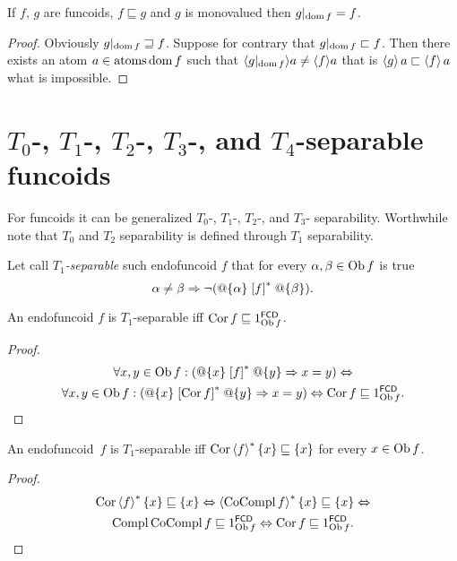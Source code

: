 \begin{thm}
If $f$, $g$ are funcoids, $f\sqsubseteq g$ and $g$ is monovalued
then $g|_{\operatorname{dom} f}=f$.\end{thm}
\begin{proof}
Obviously $g|_{\operatorname{dom} f}\sqsupseteq f$. Suppose for contrary that $g|_{\operatorname{dom}
f}\sqsubset f$.
Then there exists an atom $a\in\operatorname{atoms}\operatorname{dom} f$ such that $\langle g|_{\operatorname{dom}
f}\rangle a\neq\langle f\rangle a$
that is $\left\langle g\right\rangle a\sqsubset\left\langle f\right\rangle a$ what is impossible.
\end{proof}

\section{\texorpdfstring{$T_{0}$-, $T_{1}$-, $T_{2}$-, $T_{3}$-, and $T_{4}$-separable
funcoids}%
{T0-, T1-, T2-, and T3-separable funcoids}}

For funcoids it can be generalized $T_{0}$-,
$T_{1}$-, $T_{2}$-, and $T_{3}$- separability. Worthwhile note
that $T_{0}$ and $T_{2}$ separability is defined through $T_{1}$
separability.
\begin{defn}
Let call \emph{$T_{1}$-separable} such endofuncoid $f$ that for
every $\alpha,\beta\in\operatorname{Ob} f$ is true
\[
\alpha\ne\beta\Rightarrow\lnot(@\{\alpha\}\mathrel{\left[f\right]^{\ast}}@\{\beta\}).
\]
\end{defn}
\begin{prop}
An endofuncoid $f$ is $T_{1}$-separable iff $\operatorname{Cor} f\sqsubseteq1_{\operatorname{Ob}
f}^{\mathsf{FCD}}$.\end{prop}
\begin{proof}
~
\begin{multline*}
\forall x,y\in\operatorname{Ob} f:(@\{x\}\mathrel{\left[f\right]^{\ast}}@\{y\}\Rightarrow x=y)\Leftrightarrow\\
\forall x,y\in\operatorname{Ob} f:(@\{x\}\mathrel{\left[\operatorname{Cor} f\right]^{\ast}}@\{y\}\Rightarrow x=y)\Leftrightarrow\operatorname{Cor} f\sqsubseteq1_{\operatorname{Ob} f}^{\mathsf{FCD}}.
\end{multline*}
\end{proof}

\begin{prop}
An endofuncoid~$f$ is $T_{1}$-separable iff $\operatorname{Cor}\left\langle f\right\rangle ^{\ast}\{x\}\sqsubseteq\{x\}$ for every $x\in\operatorname{Ob} f$.
\end{prop}

\begin{proof}
\begin{multline*}
\operatorname{Cor} \left\langle f\right\rangle ^{\ast} \{ x \} \sqsubseteq \{ x \}
\Leftrightarrow \left\langle \operatorname{CoCompl} f\right\rangle ^{\ast} \{ x \} \sqsubseteq \{
x \} \Leftrightarrow \\ \operatorname{Compl} \operatorname{CoCompl} f \sqsubseteq
1^{\mathsf{FCD}}_{\operatorname{Ob} f} \Leftrightarrow \operatorname{Cor} f \sqsubseteq
1^{\mathsf{FCD}}_{\operatorname{Ob} f}.
\end{multline*}
\end{proof}

